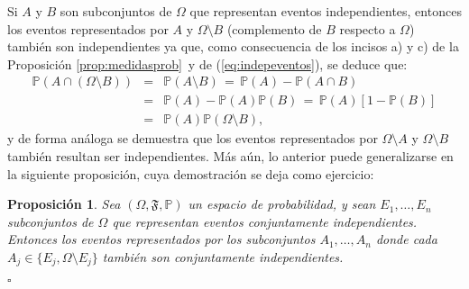 \documentclass[spanish,10pt,letterpaper]{article}
\newtheorem{prop}{Proposición}
\newcommand{\prob}{\mathbb{P}}
\newcommand{\qed}{\begin{flushright}$\square$\end{flushright}}
\begin{document}
	Si $A$ y $B$ son subconjuntos de $\Omega$ que representan eventos independientes, entonces los eventos representados por $A$ y $\Omega\setminus B$ (complemento de $B$ respecto a $\Omega$) también son independientes ya que, como consecuencia de los incisos a) y c) de la Proposición \ref{prop:medidasprob}\, y de (\ref{eq:indepeventos}), se deduce que:
	\begin{eqnarray*}
		\prob\left(A\cap (\Omega\setminus B)\right) &=& \prob(A\setminus B) \,=\, \prob(A) - \prob(A\cap B) \\ 
		                                            &=& \prob(A) - \prob(A)\prob(B) \,=\, \prob(A)[1-\prob(B)] \\ 
		                                            &=& \prob(A)\prob\left(\Omega\setminus B\right),
	\end{eqnarray*}
	y de forma análoga se demuestra que los eventos representados por $\Omega\setminus A$ y $\Omega\setminus B$ también resultan ser independientes. Más aún, lo anterior puede generalizarse en la siguiente proposición, cuya demostración se deja como ejercicio:
	
	\bigskip 
	
	\begin{prop} \label{prop:indepcomplem}
		Sea $(\Omega,\mathfrak{F},\prob)$ un espacio de probabilidad, y sean $E_1,\ldots,E_n$ subconjuntos de $\Omega$ que representan eventos conjuntamente independientes. Entonces los eventos representados por los subconjuntos $A_1,\ldots,A_n$ donde cada $A_j\in\{E_j,\Omega\setminus E_j\}$ también son conjuntamente independientes. \qed 
	\end{prop}
	
\end{document}
